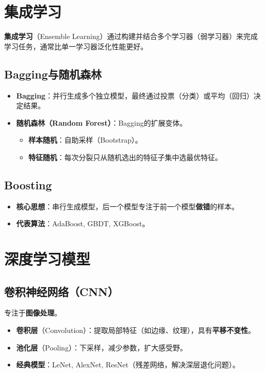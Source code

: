 \section{集成学习}

\begin{conceptbox}
\textbf{集成学习}（Ensemble Learning）通过构建并结合多个学习器（弱学习器）来完成学习任务，通常比单一学习器泛化性能更好。
\end{conceptbox}

\subsection{Bagging与随机森林}
\begin{itemize}[leftmargin=2em,itemsep=0pt]
    \item \textbf{Bagging}：并行生成多个独立模型，最终通过投票（分类）或平均（回归）决定结果。
    \item \textbf{随机森林（Random Forest）}：Bagging的扩展变体。
    \begin{itemize}
        \item \textbf{样本随机}：自助采样（Bootstrap）。
        \item \textbf{特征随机}：每次分裂只从随机选出的特征子集中选最优特征。
    \end{itemize}
\end{itemize}

\subsection{Boosting}
\begin{itemize}[leftmargin=2em,itemsep=0pt]
    \item \textbf{核心思想}：串行生成模型，后一个模型专注于前一个模型\textbf{做错}的样本。
    \item \textbf{代表算法}：AdaBoost, GBDT, XGBoost。
\end{itemize}

\section{深度学习模型}

\subsection{卷积神经网络（CNN）}
专注于\textbf{图像处理}。
\begin{itemize}[leftmargin=2em,itemsep=0pt]
    \item \textbf{卷积层}（Convolution）：提取局部特征（如边缘、纹理），具有\textbf{平移不变性}。
    \item \textbf{池化层}（Pooling）：下采样，减少参数，扩大感受野。
    \item \textbf{经典模型}：LeNet, AlexNet, ResNet（残差网络，解决深层退化问题）。
\end{itemize}

